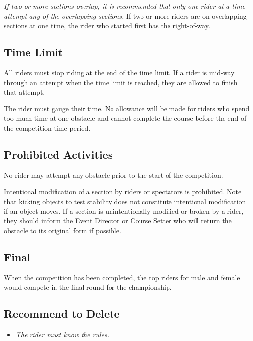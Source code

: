 \textit{If two or more sections overlap, it is recommended that only one rider at a time attempt any of the overlapping sections. }
If two or more riders are on overlapping sections at one time, the rider who started first has the right-of-way.

\subsection{Time Limit}

All riders must stop riding at the end of the time limit. 
If a rider is mid-way through an attempt when the time limit is reached, they are allowed to finish that attempt.

The rider must gauge their time. 
No allowance will be made for riders who spend too much time at one obstacle and cannot complete the course before the end of the competition time period.

\subsection{Prohibited Activities}
No rider may attempt any obstacle prior to the start of the competition. 

Intentional modification of a section by riders or spectators is prohibited. 
Note that kicking objects to test stability does not constitute intentional modification if an object moves. 
If a section is unintentionally modified or broken by a rider, they should inform the Event Director or Course Setter who will return the obstacle to its original form if possible.

\subsection{Final}

When the competition has been completed, the top riders for male and female would compete in the final round for the championship.

\subsection{Recommend to Delete}

\begin{itemize}
\item \textit{The rider must know the rules.}
\end{itemize}

